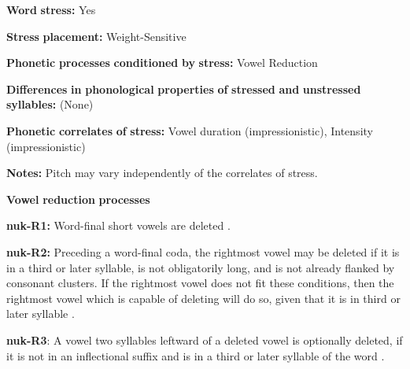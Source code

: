 \documentclass[output=paper]{langsci/langscibook}
\begin{document}
\begin{styleBody}
\textbf{Word} \textbf{stress:} Yes
\end{styleBody}

\begin{styleBody}
\textbf{Stress} \textbf{placement:} Weight-Sensitive
\end{styleBody}

\begin{styleBody}
\textbf{Phonetic} \textbf{processes} \textbf{conditioned} \textbf{by} \textbf{stress:} Vowel Reduction
\end{styleBody}

\begin{styleBody}
\textbf{Differences} \textbf{in} \textbf{phonological} \textbf{properties} \textbf{of} \textbf{stressed} \textbf{and} \textbf{unstressed} \textbf{syllables:} (None)
\end{styleBody}

\begin{styleBody}
\textbf{Phonetic} \textbf{correlates} \textbf{of} \textbf{stress:} Vowel duration (impressionistic), Intensity (impressionistic)
\end{styleBody}

\begin{styleBody}
\textbf{Notes:} Pitch may vary independently of the correlates of stress.
\end{styleBody}

\begin{styleBody}
\textbf{Vowel} \textbf{reduction} \textbf{processes}
\end{styleBody}

\begin{styleBody}
\textbf{nuk-R1:} Word-final short vowels are deleted \citep[25]{Rose1981}.
\end{styleBody}

\begin{styleBody}
\textbf{nuk-R2:} Preceding a word-final coda, the rightmost vowel may be deleted if it is in a third or later syllable, is not obligatorily long, and is not already flanked by consonant clusters. If the rightmost vowel does not fit these conditions, then the rightmost vowel which is capable of deleting will do so, given that it is in third or later syllable \citep[25]{Rose1981}.
\end{styleBody}

\begin{styleBody}
\textbf{nuk-R3}: A vowel two syllables leftward of a deleted vowel is optionally deleted, if it is not in an inflectional suffix and is in a third or later syllable of the word \citep[25]{Rose1981}.
\end{styleBody}
\end{document}

